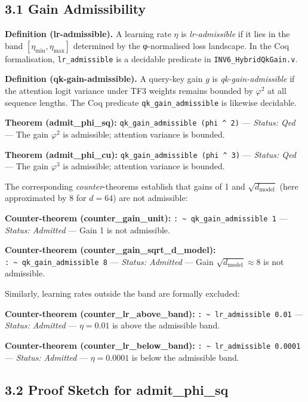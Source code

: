 \subsection{3.1 Gain
Admissibility}\label{fa_08:gain-admissibility}

\textbf{Definition (lr-admissible).} A learning
rate \(\eta\) is \emph{lr-admissible} if it lies
in the band \([\eta_{\min}, \eta_{\max}]\)
determined by the φ-normalised loss landscape. In
the Coq formalisation, \texttt{lr\_admissible} is
a decidable predicate in
\texttt{INV6\_HybridQkGain.v}.

\textbf{Definition (qk-gain-admissible).} A
query-key gain \(g\) is \emph{qk-gain-admissible}
if the attention logit variance under TF3 weights
remains bounded by \(\varphi^2\) at all sequence
lengths. The Coq predicate
\texttt{qk\_gain\_admissible} is likewise
decidable.

\textbf{Theorem (admit\_phi\_sq):}
\texttt{qk\_gain\_admissible\ (phi\ \^{}\ 2)} ---
\emph{Status: Qed} --- The gain \(\varphi^2\) is
admissible; attention variance is bounded.

\textbf{Theorem (admit\_phi\_cu):}
\texttt{qk\_gain\_admissible\ (phi\ \^{}\ 3)} ---
\emph{Status: Qed} --- The gain \(\varphi^3\) is
admissible; attention variance is bounded.

The corresponding \emph{counter}-theorems
establish that gains of 1 and
\(\sqrt{d_\text{model}}\) (here approximated by 8
for \(d=64\)) are not admissible:

\textbf{Counter-theorem (counter\_gain\_unit):}
\texttt{:\ \textasciitilde{}\ qk\_gain\_admissible\ 1}
--- \emph{Status: Admitted} --- Gain 1 is not
admissible.

\textbf{Counter-theorem
(counter\_gain\_sqrt\_d\_model):}
\texttt{:\ \textasciitilde{}\ qk\_gain\_admissible\ 8}
--- \emph{Status: Admitted} --- Gain
\(\sqrt{d_\text{model}} \approx 8\) is not
admissible.

Similarly, learning rates outside the band are
formally excluded:

\textbf{Counter-theorem
(counter\_lr\_above\_band):}
\texttt{:\ \textasciitilde{}\ lr\_admissible\ 0.01}
--- \emph{Status: Admitted} --- \(\eta = 0.01\) is
above the admissible band.

\textbf{Counter-theorem
(counter\_lr\_below\_band):}
\texttt{:\ \textasciitilde{}\ lr\_admissible\ 0.0001}
--- \emph{Status: Admitted} --- \(\eta = 0.0001\)
is below the admissible band.

\subsection{3.2 Proof Sketch for
admit\_phi\_sq}\label{fa_08:proof-sketch-for-admit_phi_sq}

